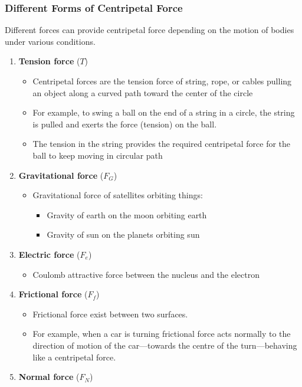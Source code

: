 \subsubsection*{Different Forms of Centripetal Force}
Different forces can provide centripetal force
depending on the motion of bodies under various conditions.
\begin{enumerate}
	\item \textbf{Tension force} ($T$)
		\begin{itemize}
			\item Centripetal forces are the tension force of string, rope, or cables pulling an object
				along a curved path toward the center of the circle
			\item For example, to swing a ball on the end of a string in a circle,
				the string is pulled and exerts the force (tension) on the ball.
			\item The tension in the string provides the required centripetal force
				for the ball to keep moving in circular path
		\end{itemize}
	\item \textbf{Gravitational force} ($F_G$)
		\begin{itemize}
			\item Gravitational force of satellites orbiting things:
				\begin{itemize}
					\item Gravity of earth on the moon orbiting earth
					\item Gravity of sun on the planets orbiting sun
				\end{itemize}
		\end{itemize}
	\item \textbf{Electric force} ($F_e$)
		\begin{itemize}
			\item Coulomb attractive force between the nucleus and the electron
		\end{itemize}
	\item \textbf{Frictional force} ($F_f$)
		\begin{itemize}
			\item Frictional force exist between two surfaces.
			\item For example, when a car is turning frictional force
				acts normally to the direction of motion of the car---towards
				the centre of the turn---behaving like a centripetal force.
		\end{itemize}
	\item \textbf{Normal force} ($F_N$)

\end{enumerate}
